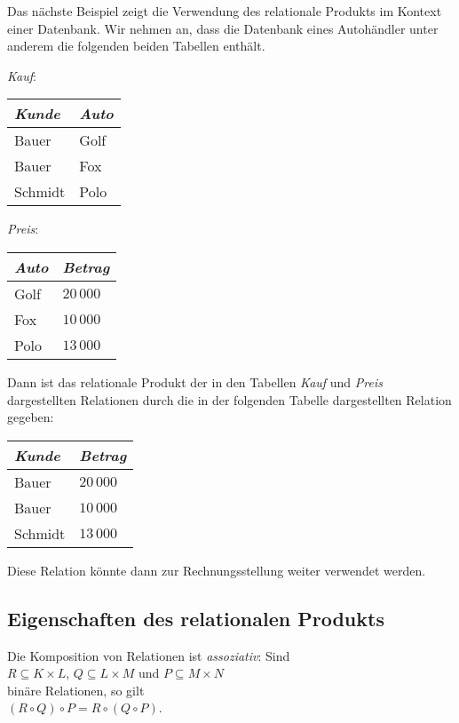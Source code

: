 \example
Das n\"{a}chste Beispiel zeigt die Verwendung des relationale Produkts im Kontext einer
Datenbank.  Wir nehmen an, dass die Datenbank eines Autoh\"{a}ndler unter anderem die
folgenden beiden Tabellen enth\"{a}lt.
\begin{center}
\textsl{Kauf}:  \begin{tabular}[t]{|l|l|}
\hline
\textsl{Kunde} & \textsl{Auto} \\
\hline
\hline
  Bauer   & Golf \\
\hline
  Bauer   & Fox  \\
\hline
  Schmidt & Polo \\
\hline
  \end{tabular}
\qquad \textsl{Preis}:
  \begin{tabular}[t]{|l|l|}
\hline
\textsl{Auto} & \textsl{Betrag} \\
\hline
\hline
  Golf    & $20\,000$ \\
\hline
  Fox     & $10\,000$ \\
\hline
  Polo    & $13\,000$ \\
\hline
  \end{tabular}
\end{center}
Dann ist das relationale Produkt der in den Tabellen \textsl{Kauf} und \textsl{Preis}
dargestellten Relationen durch die in der folgenden Tabelle dargestellten Relation
gegeben:

\begin{center}
  \begin{tabular}[t]{|l|l|}
\hline
\textsl{Kunde} & \textsl{Betrag} \\
\hline
\hline
  Bauer   & $20\,000$ \\
\hline
  Bauer   & $10\,000$ \\
\hline
  Schmidt & $13\,000$ \\
\hline
  \end{tabular} 
\end{center}
Diese Relation k\"{o}nnte dann zur Rechnungsstellung weiter verwendet werden. \eox
\pagebreak

\subsection{Eigenschaften des relationalen Produkts}
\begin{Satz}
  Die Komposition von Relationen ist \emph{assoziativ}:  Sind \\[0.2cm]
  \hspace*{1.3cm} 
  $R \subseteq K \times L$, \quad $Q \subseteq L \times M$ \quad und \quad 
  $P \subseteq M \times N$ \\[0.2cm]
  bin\"{a}re Relationen, so gilt \\[0.2cm]
  \hspace*{1.3cm} $(R \circ Q) \circ P = R \circ (Q \circ P)$. 
\end{Satz}


